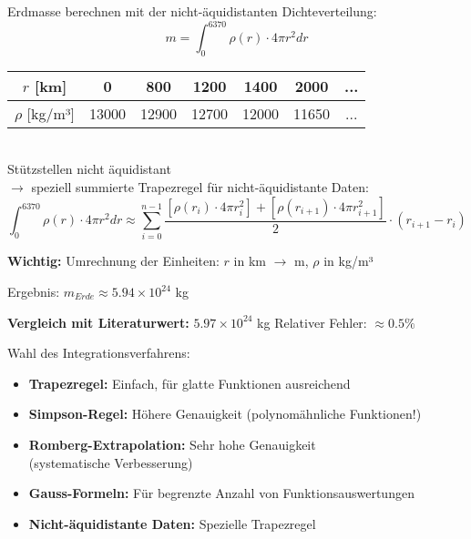 \begin{example2}{Erdmasse berechnen} 
mit der nicht-äquidistanten Dichteverteilung:
\vspace{-3mm}\\
$$m = \int_0^{6370} \rho(r) \cdot 4\pi r^2 dr$$

\begin{tabular}{|c|c|c|c|c|c|c|}
\hline
$r$ [km] & 0 & 800 & 1200 & 1400 & 2000 & ... \\
\hline
$\rho$ [kg/m³] & 13000 & 12900 & 12700 & 12000 & 11650 & ... \\
\hline
\end{tabular}
\vspace{1mm}\\
Stützstellen nicht äquidistant \\ $\rightarrow$ speziell summierte Trapezregel für nicht-äquidistante Daten:
$$\int_0^{6370} \rho(r) \cdot 4\pi r^2 dr \approx \sum_{i=0}^{n-1} \frac{[\rho(r_i) \cdot 4\pi r_i^2] + [\rho(r_{i+1}) \cdot 4\pi r_{i+1}^2]}{2} \cdot (r_{i+1} - r_i)$$

\textbf{Wichtig:} Umrechnung der Einheiten: $r$ in km $\rightarrow$ m, $\rho$ in kg/m³

Ergebnis: $m_{Erde} \approx 5.94 \times 10^{24}$ kg

\textbf{Vergleich mit Literaturwert:} $5.97 \times 10^{24}$ kg
Relativer Fehler: $\approx 0.5\%$
\end{example2}

\begin{KR}{Wahl des Integrationsverfahrens:}
\begin{itemize}
    \item \textbf{Trapezregel:} Einfach, für glatte Funktionen ausreichend
    \item \textbf{Simpson-Regel:} Höhere Genauigkeit (polynomähnliche Funktionen!)
    \item \textbf{Romberg-Extrapolation:} Sehr hohe Genauigkeit\\ (systematische Verbesserung)
    \item \textbf{Gauss-Formeln:} Für begrenzte Anzahl von Funktionsauswertungen
    \item \textbf{Nicht-äquidistante Daten:} Spezielle Trapezregel
\end{itemize}
\end{KR}

